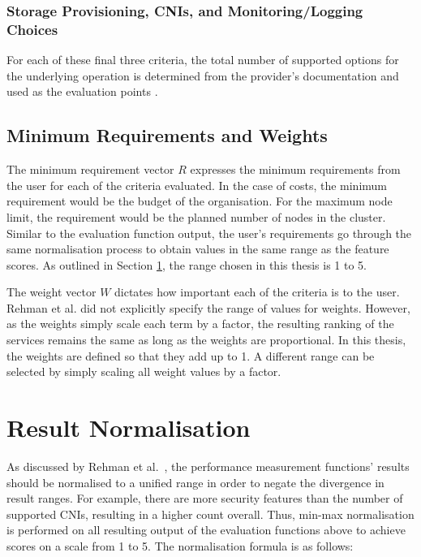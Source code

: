\subsubsection{Storage Provisioning, CNIs, and Monitoring/Logging Choices}\label{storage-provisioning-cnis-and-monitoring-and-logging}

For each of these final three criteria, the total number of supported options for the underlying operation is determined from the provider's documentation and used as the evaluation points \cite{WhatAmazonEKS,nickomangAzureKubernetesServicea,GoogleKubernetesEngine,WelcomeOpenShiftContainer}.

\subsection{Minimum Requirements and Weights}\label{performance-evaluation-functions}

The minimum requirement vector $R$ expresses the minimum requirements from the user for each of the criteria evaluated. In the case of costs, the minimum requirement would be the budget of the organisation. For the maximum node limit, the requirement would be the planned number of nodes in the cluster. Similar to the evaluation function output, the user's requirements go through the same normalisation process to obtain values in the same range as the feature scores. As outlined in Section \ref{result-normalisation}, the range chosen in this thesis is 1 to 5.

The weight vector $W$ dictates how important each of the criteria is to the user. Rehman et al. \cite{5976164} did not explicitly specify the range of values for weights. However, as the weights simply scale each term by a factor, the resulting ranking of the services remains the same as long as the weights are proportional. In this thesis, the weights are defined so that they add up to 1. A different range can be selected by simply scaling all weight values by a factor.


\section{Result Normalisation}\label{result-normalisation}

As discussed by Rehman et al.~\cite{5976164}, the performance
measurement functions' results should be normalised to a unified range in order to negate the divergence in result ranges. For example, there are more security features than the number of supported CNIs, resulting in a higher count overall. Thus,
min-max normalisation is performed on all resulting output of the evaluation functions above to
achieve scores on a scale from 1 to 5. The normalisation formula is as follows:

